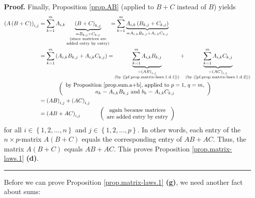 \documentclass[numbers=enddot,12pt,final,onecolumn,notitlepage]{scrartcl}%
\theoremstyle{definition}
\newenvironment{proof}[1][Proof]{\noindent\textbf{#1.} }{\ \rule{0.5em}{0.5em}}
\let\sumnonlimits\sum
\renewcommand{\sum}{\sumnonlimits\limits}
\begin{document}
\begin{proof}
Finally, Proposition \ref{prop.AB} (applied to $B+C$ instead of $B$) yields%
\begin{align*}
\left(  A\left(  B+C\right)  \right)  _{i,j}  &  =\sum_{k=1}^{m}%
A_{i,k}\underbrace{\left(  B+C\right)  _{k,j}}_{\substack{=B_{k,j}%
+C_{k,j}\\\text{(since matrices are}\\\text{added entry by entry)}}%
}=\sum_{k=1}^{m}\underbrace{A_{i,k}\left(  B_{k,j}+C_{k,j}\right)  }%
_{=A_{i,k}B_{k,j}+A_{i,k}C_{k,j}}\\
&  =\sum_{k=1}^{m}\left(  A_{i,k}B_{k,j}+A_{i,k}C_{k,j}\right)
=\underbrace{\sum_{k=1}^{m}A_{i,k}B_{k,j}}_{\substack{=\left(  AB\right)
_{i,j}\\\text{(by (\ref{pf.prop.matrix-laws.1.d.1}))}}}+\underbrace{\sum
_{k=1}^{m}A_{i,k}C_{k,j}}_{\substack{=\left(  AC\right)  _{i,j}\\\text{(by
(\ref{pf.prop.matrix-laws.1.d.2}))}}}\\
&  \ \ \ \ \ \ \ \ \ \ \left(
\begin{array}
[c]{c}%
\text{by Proposition \ref{prop.sum.a+b}, applied to }p=1\text{, }q=m\text{,}\\
a_{k}=A_{i,k}B_{k,j}\text{ and }b_{k}=A_{i,k}C_{k,j}%
\end{array}
\right) \\
&  =\left(  AB\right)  _{i,j}+\left(  AC\right)  _{i,j}\\
&  =\left(  AB+AC\right)  _{i,j}\ \ \ \ \ \ \ \ \ \ \left(
\begin{array}
[c]{c}%
\text{again because matrices}\\
\text{are added entry by entry}%
\end{array}
\right)
\end{align*}
for all $i\in\left\{  1,2,\ldots,n\right\}  $ and $j\in\left\{  1,2,\ldots
,p\right\}  $. In other words, each entry of the $n\times p$-matrix $A\left(
B+C\right)  $ equals the corresponding entry of $AB+AC$. Thus, the matrix
$A\left(  B+C\right)  $ equals $AB+AC$. This proves Proposition
\ref{prop.matrix-laws.1} \textbf{(d)}.
\end{proof}

Before we can prove Proposition \ref{prop.matrix-laws.1} \textbf{(g)}, we need
another fact about sums:
\end{document}

